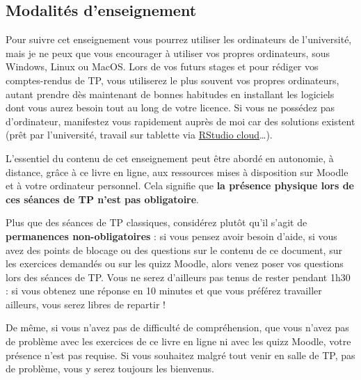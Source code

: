 \documentclass[
  letterpaper,
  DIV=11,
  numbers=noendperiod]{scrreprt}
\begin{document}
\hypertarget{modalituxe9s-denseignement}{%
\subsection*{Modalités
d'enseignement}\label{modalituxe9s-denseignement}}

Pour suivre cet enseignement vous pourrez utiliser les ordinateurs de
l'université, mais je ne peux que vous encourager à utiliser vos propres
ordinateurs, sous Windows, Linux ou MacOS. Lors de vos futurs stages et
pour rédiger vos comptes-rendus de TP, vous utiliserez le plus souvent
vos propres ordinateurs, autant prendre dès maintenant de bonnes
habitudes en installant les logiciels dont vous aurez besoin tout au
long de votre licence. Si vous ne possédez pas d'ordinateur, manifestez
vous rapidement auprès de moi car des solutions existent (prêt par
l'université, travail sur tablette via
\href{https://rstudio.cloud}{RStudio cloud}\ldots).

\begin{tcolorbox}[enhanced jigsaw, bottomtitle=1mm, title=\textcolor{quarto-callout-important-color}{\faExclamation}\hspace{0.5em}{Important}, breakable, opacitybacktitle=0.6, coltitle=black, opacityback=0, toprule=.15mm, toptitle=1mm, titlerule=0mm, colback=white, rightrule=.15mm, arc=.35mm, leftrule=.75mm, bottomrule=.15mm, left=2mm, colframe=quarto-callout-important-color-frame, colbacktitle=quarto-callout-important-color!10!white]
L'essentiel du contenu de cet enseignement peut être abordé en
autonomie, à distance, grâce à ce livre en ligne, aux ressources mises à
disposition sur Moodle et à votre ordinateur personnel. Cela signifie
que \textbf{la présence physique lors de ces séances de TP n'est pas
obligatoire}.
\end{tcolorbox}

Plus que des séances de TP classiques, considérez plutôt qu'il s'agit de
\textbf{permanences non-obligatoires} : si vous pensez avoir besoin
d'aide, si vous avez des points de blocage ou des questions sur le
contenu de ce document, sur les exercices demandés ou sur les quizz
Moodle, alors venez poser vos questions lors des séances de TP. Vous ne
serez d'ailleurs pas tenus de rester pendant 1h30 : si vous obtenez une
réponse en 10 minutes et que vous préférez travailler ailleurs, vous
serez libres de repartir !

De même, si vous n'avez pas de difficulté de compréhension, que vous
n'avez pas de problème avec les exercices de ce livre en ligne ni avec
les quizz Moodle, votre présence n'est pas requise. Si vous souhaitez
malgré tout venir en salle de TP, pas de problème, vous y serez toujours
les bienvenus.
\end{document}
